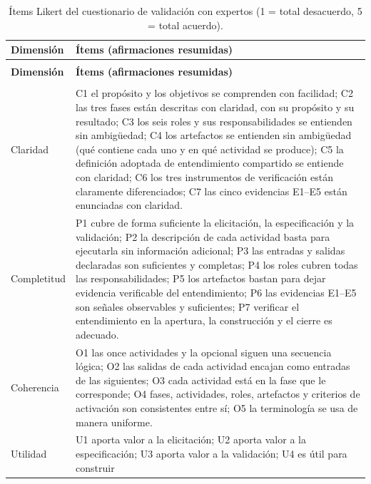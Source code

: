 \documentclass[12pt,letterpaper,oneside]{report}
\begin{document}
{\footnotesize
\renewcommand{\arraystretch}{1.12}
\begin{xltabular}{\textwidth}{@{}>{\raggedright\arraybackslash}p{0.17\textwidth}X@{}}
\caption{Ítems Likert del cuestionario de validación con expertos (1 = total
desacuerdo, 5 = total acuerdo).\label{tab:cuestionario}}\\
\toprule
\textbf{Dimensión} & \textbf{Ítems (afirmaciones resumidas)} \\
\midrule
\endfirsthead
{}\\
\toprule
\textbf{Dimensión} & \textbf{Ítems (afirmaciones resumidas)} \\
\midrule
\endhead
\midrule
{}\\
\endfoot
\bottomrule
\endlastfoot
Claridad & C1 el propósito y los objetivos se comprenden con facilidad; C2 las
tres fases están descritas con claridad, con su propósito y su resultado; C3 los
seis roles y sus responsabilidades se entienden sin ambigüedad; C4 los
artefactos se entienden sin ambigüedad (qué contiene cada uno y en qué actividad
se produce); C5 la definición adoptada de entendimiento compartido se entiende
con claridad; C6 los tres instrumentos de verificación están claramente
diferenciados; C7 las cinco evidencias E1--E5 están enunciadas con claridad. \\
\addlinespace
Completitud & P1 cubre de forma suficiente la elicitación, la especificación y
la validación; P2 la descripción de cada actividad basta para ejecutarla sin
información adicional; P3 las entradas y salidas declaradas son suficientes y
completas; P4 los roles cubren todas las responsabilidades; P5 los artefactos
bastan para dejar evidencia verificable del entendimiento; P6 las evidencias
E1--E5 son señales observables y suficientes; P7 verificar el entendimiento en
la apertura, la construcción y el cierre es adecuado. \\
\addlinespace
Coherencia & O1 las once actividades y la opcional siguen una secuencia lógica;
O2 las salidas de cada actividad encajan como entradas de las siguientes; O3
cada actividad está en la fase que le corresponde; O4 fases, actividades, roles,
artefactos y criterios de activación son consistentes entre sí; O5 la
terminología se usa de manera uniforme. \\
\addlinespace
Utilidad & U1 aporta valor a la elicitación; U2 aporta valor a la
especificación; U3 aporta valor a la validación; U4 es útil para construir

\end{xltabular}}
\end{document}
